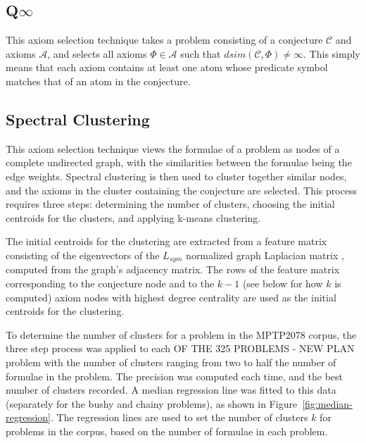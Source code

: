 \documentclass[EPiC]{easychair}
\begin{document}
\subsection{Q$\infty$}
\label{QinghuaInf}

This axiom selection technique takes a problem consisting of a conjecture 
$\mathcal{C}$ and axioms $\mathcal{A}$, and selects all axioms 
$\Phi \in \mathcal{A}$ such that $dsim(\mathcal{C},\Phi) \neq \infty$.
This simply means that each axiom contains at least one atom whose predicate
symbol matches that of an atom in the conjecture.

% 
\subsection{Spectral Clustering}
\label{Zishi}

This axiom selection technique views the formulae of a problem as nodes
of a complete undirected graph, with the similarities between the formulae 
being the edge weights.
Spectral clustering \cite{vLu07} is then used to cluster together similar 
nodes, and the axioms in the cluster containing the conjecture are selected.
This process requires three steps:
determining the number of clusters,
choosing the initial centroids for the clusters,
and
applying k-means clustering.

The initial centroids for the clustering are extracted from a feature matrix 
consisting of the eigenvectors of the $L_{sym}$ normalized graph Laplacian 
matrix \cite{vLu07}, computed from the graph's adjacency matrix.
The rows of the feature matrix corresponding to the conjecture node and to 
the $k-1$ (see below for how $k$ is computed) axiom nodes with highest degree 
centrality are used as the initial centroids for the clustering.

To determine the number of clusters for a problem in the MPTP2078 corpus,
the three step process was applied to each OF THE 325 PROBLEMS - NEW PLAN
problem with the number of 
clusters ranging from two to half the number of formulae in the problem.
The precision was computed each time, and the best number of clusters
recorded.
A median regression line was fitted to this data (separately for the
bushy and chainy problems), as shown in Figure~\ref{fig:median-regression}.
The regression lines are used to set the number of clusters $k$ for
problems in the corpus, based on the number of formulae in each problem.
\end{document}
